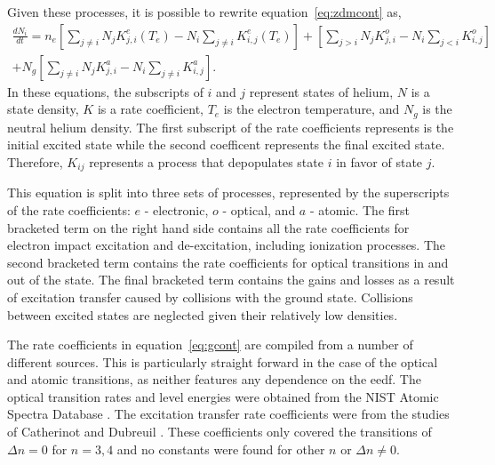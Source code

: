 Given these processes, it is possible to rewrite equation~\ref{eq:zdmcont} as,
\begin{multline}
  \frac{dN_i}{dt} =   n_e \left[       \sum_{j\neq i} N_j K^e_{j,i}(T_e) 
                                 - N_i \sum_{j\neq i}     K^e_{i,j}(T_e) \right]
                        + \left[       \sum_{j > i}   N_j K^o_{j,i} 
                                 - N_i \sum_{j < i}       K^o_{i,j}      \right] \\
                    + N_g \left[       \sum_{j\neq i} N_j K^a_{j,i} 
                                 - N_i \sum_{j\neq i}     K^a_{i,j}      \right].
  \label{eq:gcont}
\end{multline}
In these equations, the subscripts of $i$ and $j$ represent states of helium,
$N$ is a state density, $K$ is a rate coefficient, $T_e$ is the electron
temperature, and $N_g$ is the neutral helium density. The first subscript of the
rate coefficients represents is the initial excited state while the second
coefficent represents the final excited state. Therefore, $K_{ij}$ represents a
process that depopulates state $i$ in favor of state $j$.

This equation is split into three sets of processes, represented by the
superscripts of the rate coefficients: $e$ - electronic, $o$ - optical, and $a$
- atomic. The first bracketed term on the right hand side contains all the rate
coefficients for electron impact excitation and de-excitation, including
ionization processes. The second bracketed term contains the rate coefficients
for optical transitions in and out of the state. The final bracketed term
contains the gains and losses as a result of excitation transfer caused by
collisions with the ground state. Collisions between excited states are
neglected given their relatively low densities.

The rate coefficients in equation~\ref{eq:gcont} are compiled from a number of
different sources. This is particularly straight forward in the case of the
optical and atomic transitions, as neither features any dependence on the
\acs{eedf}. The optical transition rates and level energies were obtained from
the NIST Atomic Spectra Database \cite{Kramida2012}. The excitation transfer
rate coefficients were from the studies of Catherinot and Dubreuil
\cite{Catherinot1981, Dubreuil1980}. These coefficients only covered the
transitions of $\Delta n=0$ for $n=3,4$ and no constants were found for other
$n$ or $\Delta n\neq 0$.

